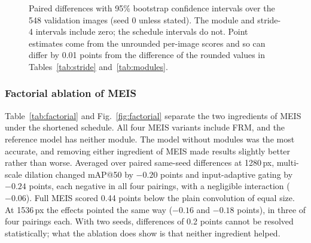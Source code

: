 \documentclass[preprint,12pt]{elsarticle}
\begin{document}
\begin{figure}[t]
\centering
{}
\caption{Paired differences with 95\% bootstrap confidence intervals over the 548
validation images (seed 0 unless stated). The module and stride-4 intervals include
zero; the schedule intervals do not. Point estimates come from the unrounded
per-image scores and so can differ by 0.01 points from the difference of the
rounded values in Tables~\ref{tab:stride} and~\ref{tab:modules}.}
\label{fig:forest}
\end{figure}

\subsubsection{Factorial ablation of MEIS}
\label{sec:res-factorial}

Table~\ref{tab:factorial} and Fig.~\ref{fig:factorial} separate the two ingredients
of MEIS under the shortened schedule. All four MEIS variants include FRM, and the
reference model has neither module. The model without modules was the most
accurate, and removing either ingredient of MEIS made results slightly better
rather than worse. Averaged over paired same-seed differences at 1280\,px,
multi-scale dilation changed mAP@50 by $-0.20$ points and input-adaptive gating by
$-0.24$ points, each negative in all four pairings, with a negligible interaction
($-0.06$). Full MEIS scored 0.44 points below the plain convolution of equal size.
At 1536\,px the effects pointed the same way ($-0.16$ and $-0.18$ points), in three
of four pairings each. With two seeds, differences of 0.2 points cannot be resolved
statistically; what the ablation does show is that neither ingredient helped.
\end{document}
